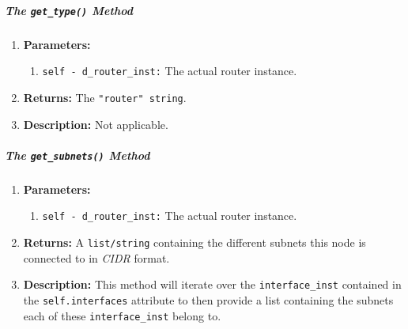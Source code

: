         \subparagraph{The \texttt{get\_type()} Method}
            \begin{enumerate}
                \item \textbf{Parameters:}
                \begin{enumerate}
                    \item \texttt{self - d\_router\_inst:} The actual router instance.
                \end{enumerate}
                \item \textbf{Returns:} The \texttt{"router" string}.
                \item \textbf{Description:} Not applicable.
            \end{enumerate}

        \subparagraph{The \texttt{get\_subnets()} Method}
            \begin{enumerate}
                \item \textbf{Parameters:}
                \begin{enumerate}
                    \item \texttt{self - d\_router\_inst:} The actual router instance.
                \end{enumerate}
                \item \textbf{Returns:} A \texttt{list/string} containing the different subnets this node is connected to in \textit{CIDR} format.
                \item \textbf{Description:} This method will iterate over the \texttt{interface\_inst} contained in the \texttt{self.interfaces} attribute to then provide a list containing the subnets each of these \texttt{interface\_inst} belong to.
            \end{enumerate}

